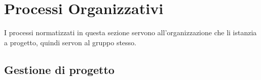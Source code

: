 \section{Processi Organizzativi}
  I processi normatizzati in questa sezione servono all'organizzazione che li istanzia a progetto, quindi servon al gruppo stesso.
  \subsection{Gestione di progetto}
    
